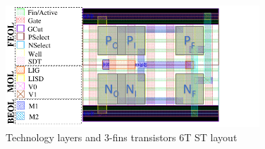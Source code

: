 \documentclass[pgmicro,diss,english]{iiufrgs}
\begin{document}
\begin{figure}[]
\centering
\includegraphics[width=0.85\textwidth, trim={0 0 1.5cm 0},clip]{camadasSTv2.pdf}
\caption{Technology layers and 3-fins transistors 6T ST layout}
\label{fig:layers}
\end{figure}
\end{document}
